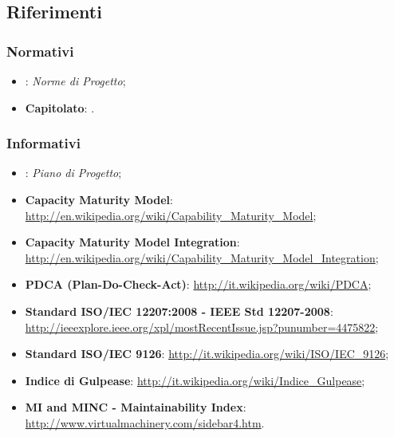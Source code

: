 \subsection{Riferimenti}
\subsubsection{Normativi}
\begin{itemize}
\item \textbf{\NdP}: \textit{Norme di Progetto};
\item \textbf{Capitolato}: .
\end{itemize}

\subsubsection{Informativi}
\begin{itemize}
\item \textbf{\PdP}: \textit{Piano di Progetto};
\item \textbf{Capacity Maturity Model}: \url{http://en.wikipedia.org/wiki/Capability_Maturity_Model};
\item \textbf{Capacity Maturity Model Integration}: \url{http://en.wikipedia.org/wiki/Capability_Maturity_Model_Integration};
\item \textbf{PDCA (Plan-Do-Check-Act)}: \url{http://it.wikipedia.org/wiki/PDCA};
\item \textbf{Standard ISO/IEC 12207:2008 - IEEE Std 12207-2008}: \url{http://ieeexplore.ieee.org/xpl/mostRecentIssue.jsp?punumber=4475822};
\item \textbf{Standard ISO/IEC 9126}: \url{http://it.wikipedia.org/wiki/ISO/IEC_9126};
\item \textbf{Indice di Gulpease}: \url{http://it.wikipedia.org/wiki/Indice_Gulpease};
\item \textbf{MI and MINC - Maintainability Index}: \url{http://www.virtualmachinery.com/sidebar4.htm}.
\end{itemize}
